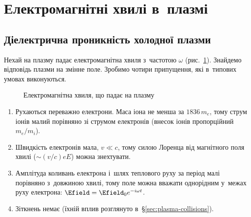 \section{Електромагнітні хвилі в~плазмі}\label{sec:plasma-waves}\hypertarget{plasma-waves}{}



\subsection*{Діелектрична проникність холодної плазми}\label{sec:plasma-permittivity}



Нехай на плазму падає електромагнітна хвиля з~частотою $\omega$ (рис.~\ref{tikz:emwave}).
Знайдемо відповідь плазми на змінне поле. Зробимо чотири припущення, які в~типових умовах
виконуються.

\begin{figure}[h!]\centering
	\caption{Електромагнітна хвиля, що падає на плазму}
	\label{tikz:emwave}
\end{figure}
\begin{enumerate}
	\item Рухаються переважно електрони. Маса іона не менша за $1836\,m_e$, тому струм
	      іонів малий порівняно зі струмом електронів (внесок іонів пропорційний $m_e/m_i$).
	\item Швидкість електронів мала, $v\ll c$, тому силою Лоренца від магнітного поля
	      хвилі ($\sim(v/c)eE$) можна знехтувати.
	\item Амплітуда коливань електрона і~шлях теплового руху за період малі порівняно
	      з~довжиною хвилі, тому поле можна вважати однорідним у~межах руху електрона:
	      $\Efield=\Efield_0e^{-i\omega t}$.
	\item Зіткнень немає (їхній вплив розглянуто в~§\ref{sec:plasma-collisions}).
\end{enumerate}

